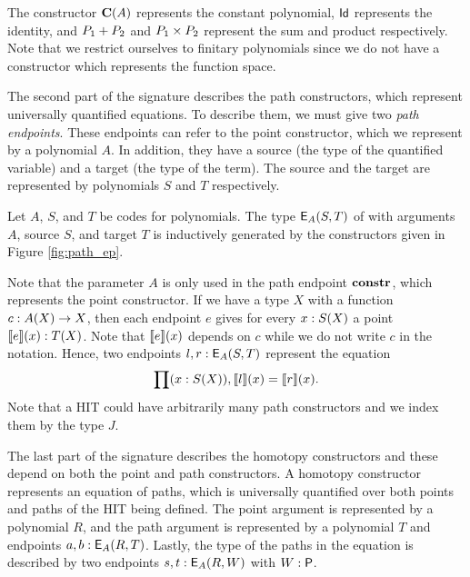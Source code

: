 The constructor $\operatorname{\mathbf{C}}(A)$ represents the constant polynomial, $\mathsf{Id}$ represents the identity,
and $P_1 + P_2$ and $P_1 \times P_2$ represent the sum and product respectively.
Note that we restrict ourselves to finitary polynomials since we do not have a constructor which represents the function space.

The second part of the signature describes the path constructors, which represent universally quantified equations.
To describe them, we must give two \emph{path endpoints}.
These endpoints can refer to the point constructor, which we represent by a polynomial $A$.
In addition, they have a source (the type of the quantified variable) and a target (the type of the term).
The source and the target are represented by polynomials $S$ and $T$ respectively.

\begin{definition}
Let $A$, $S$, and $T$ be codes for polynomials.
The type $\mathsf{E}_{A}(S,T)$ of  with arguments $A$, source  $S$, and target $T$ is inductively generated by the constructors given in Figure \ref{fig:path_ep}.
\end{definition}

Note that the parameter $A$ is only used in the path endpoint $\operatorname{\mathbf{constr}}$, which represents the point constructor.
If we have a type $X$ with a function $c : A(X) \rightarrow X$,
then each endpoint $e$ gives for every $x : S(X)$ a point $\llbracket e \rrbracket(x) : T(X)$.
Note that $\llbracket e \rrbracket(x)$ depends on $c$ while we do not write $c$ in the notation.
Hence, two endpoints $l, r : \mathsf{E}_{A}(S,T)$ represent the equation
\[
\prod (x : S(X)) , \llbracket l \rrbracket(x) = \llbracket r \rrbracket(x).
\]
Note that a HIT could have arbitrarily many path constructors and we index them by the type $J$.

The last part of the signature describes the homotopy constructors
and these depend on both the point and path constructors.
A homotopy constructor represents an equation of paths, which is universally quantified over both points and paths of
the HIT being defined.
The point argument is represented by a polynomial $R$, and the path argument is represented by a polynomial $T$ and endpoints $a, b : \mathsf{E}_{A}(R,T)$.
Lastly, the type of the paths in the equation is described by two endpoints $s, t : \mathsf{E}_{A}(R,W)$ with $W : \mathsf{P}$.


